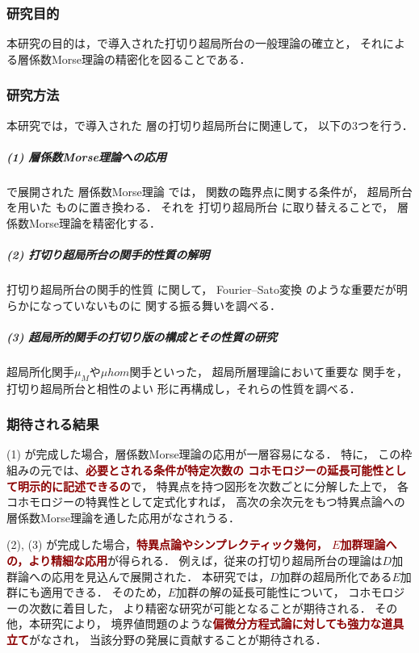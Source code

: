 \subsubsection*{研究目的}
本研究の目的は，\cite{KMS03}で導入された打切り超局所台の一般理論の確立と，
それによる層係数Morse理論の精密化を図ることである．

\subsubsection*{研究方法}
本研究では，\cite{KMS03}で導入された
層の打切り超局所台に関連して，
以下の3つを行う．
\subparagraph*{(1) 層係数Morse理論への応用}
\cite{ST92}で展開された
層係数Morse理論
では，
関数の臨界点に関する条件が，
超局所台を用いた
ものに置き換わる．
それを
打切り超局所台
に取り替えることで，
層係数Morse理論を精密化する．
\subparagraph*{(2) 打切り超局所台の関手的性質の解明}
打切り超局所台の関手的性質
に関して，
Fourier--Sato変換
のような重要だが明らかになっていないものに
関する振る舞いを調べる．
\subparagraph*{(3) 超局所的関手の打切り版の構成とその性質の研究}
超局所化関手\(\mu_M\)や\(\mu hom\)関手といった，
超局所層理論において重要な
関手を，
打切り超局所台と相性のよい
形に再構成し，それらの性質を調べる．

\subsubsection*{期待される結果}
(1) が完成した場合，層係数Morse理論の応用が一層容易になる．
特に，
この枠組みの元では、\textcolor{darkred}{\textbf{必要とされる条件が特定次数の
コホモロジーの延長可能性として明示的に記述できるの}}で，
特異点を持つ図形を次数ごとに分解した上で，
各コホモロジーの特異性として定式化すれば，
高次の余次元をもつ特異点論への層係数Morse理論を通した応用がなされうる．

(2), (3) が完成した場合，\textcolor{darkred}{\textbf{特異点論やシンプレクティック幾何，
\(E\)加群理論への，より精細な応用}}が得られる．
例えば，従来の打切り超局所台の理論は\(D\)加群論への応用を見込んで展開された．
本研究では，\(D\)加群の超局所化である\(E\)加群にも適用できる．
そのため，\(E\)加群の解の延長可能性について，
コホモロジーの次数に着目した，
より精密な研究が可能となることが期待される．
その他，本研究により，
境界値問題のような\textcolor{darkred}{\textbf{偏微分方程式論に対しても強力な道具立て}}がなされ，
当該分野の発展に貢献することが期待される．

